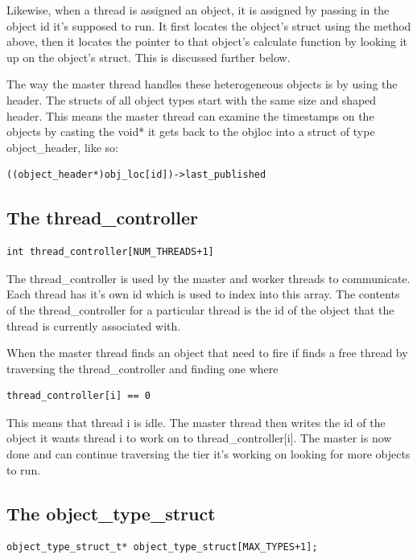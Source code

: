 \documentclass{report}
\begin{document}
Likewise, when a thread is assigned an object, it is assigned by passing in the object id it's supposed to run. It first locates the object's struct using the method above, then it locates the pointer to that object's 
calculate function by looking it up on the object's struct. This is discussed further below.

The way the master thread handles these heterogeneous objects is by using the header. The structs of all object types start with the same size and shaped header. This means the master thread can examine the timestamps on the objects by casting the void* it gets back to the objloc into a struct of type object_header, like so:

\begin{verbatim}
((object_header*)obj_loc[id])->last_published
\end{verbatim}

\subsection{The thread_controller}

\begin{verbatim}
int thread_controller[NUM_THREADS+1]
\end{verbatim}

The thread_controller is used by the master and worker threads to communicate. Each thread has it's own id which is used to index into this array. The contents of the thread_controller for a particular thread is the id of the object that the thread is currently associated with. 

When the master thread finds an object that need to fire if finds a free thread by traversing the thread_controller and finding one where

\begin{verbatim}
thread_controller[i] == 0
\end{verbatim}

This means that thread i is idle. The master thread then writes the id of the object it wants thread i to work on to thread_controller[i]. The master is now done and can continue traversing the tier it's working on looking for more objects to run. 

\subsection{The object_type_struct}

\begin{verbatim}
object_type_struct_t* object_type_struct[MAX_TYPES+1];
\end{verbatim}
\end{document}
